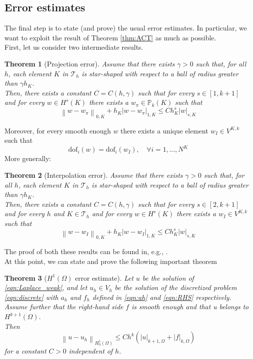 \documentclass[10pt]{article}
\newcommand{\norm}[2]{\left\lVert#1\right\rVert_{#2}}
\newcommand{\dof}{\text{dof}}
\newtheorem{theorem}{Theorem}
\begin{document}
\subsection{Error estimates}
The final step is to state (and prove) the usual error estimates. In particular, we want to exploit the result of Theorem \ref{thm:ACT} as much as possible. \\
First, let us consider two intermediate results. \\
\begin{theorem}[Projection error]
	Assume that there exists $\gamma>0$ such that, for all $h$, each element $K$ in $\mathcal{T}_h$ is star-shaped with respect to a ball of radius greater than $\gamma h_K$. \\
	Then, there exists a constant $C=C(h,\gamma)$ such that for every $s \in [1,k+1]$ and for every $w \in H^s(K)$ there exists a $w_\pi \in \mathbb{P}_k(K)$ such that
	$$\norm{w-w_\pi}{0,K}+h_K |w-w_\pi|_{1,K} \leq C h_K^s |w|_{s,K}$$
	\label{thm:projection}
\end{theorem}
Moreover, for every smooth enough $w$ there exists a unique element $w_I \in V^{K,k}$ such that $$\dof_i(w)=\dof_i(w_I), \quad \forall i=1,\dots,N^K$$ More generally: \\
\begin{theorem}[Interpolation error]
	Assume that there exists $\gamma>0$ such that, for all $h$, each element $K$ in $\mathcal{T}_h$ is star-shaped with respect to a ball of radius greater than $\gamma h_K$. \\
	Then, there exists a constant $C=C(h,\gamma)$ such that for every $s \in [2,k+1]$ and for every $h$ and $K \in \mathcal{T}_h$ and for every $w \in H^s(K)$ there exists a $w_I \in V^{K,k}$ such that
	$$\norm{w-w_I}{0,K}+h_K |w-w_I|_{1,K} \leq C h_K^s |w|_{s,K}$$
	\label{thm:interpolation}
\end{theorem}
The proof of both these results can be found in, e.g., \cite{Brenner}. \\
At this point, we can state and prove the following important theorem \\
\begin{theorem}[$H^1(\Omega)$ error estimate]
	Let $u$ be the solution of \eqref{eqn:Laplace_weak}, and let $u_h \in V_h$ be the solution of the discretized problem \eqref{eqn:discrete} with $a_h$ and $f_h$ defined in \eqref{eqn:ah} and \eqref{eqn:RHS} respectively. \\
	Assume further that the right-hand side $f$ is smooth enough and that u belongs to $H^{k+1}(\Omega)$. \\
	Then
	$$\norm{u-u_h}{H_0^1(\Omega)} \leq C h^k (|u|_{k+1,\Omega}+|f|_{k,\Omega})$$ for a constant $C>0$ independent of $h$.
\end{theorem}
\end{document}
